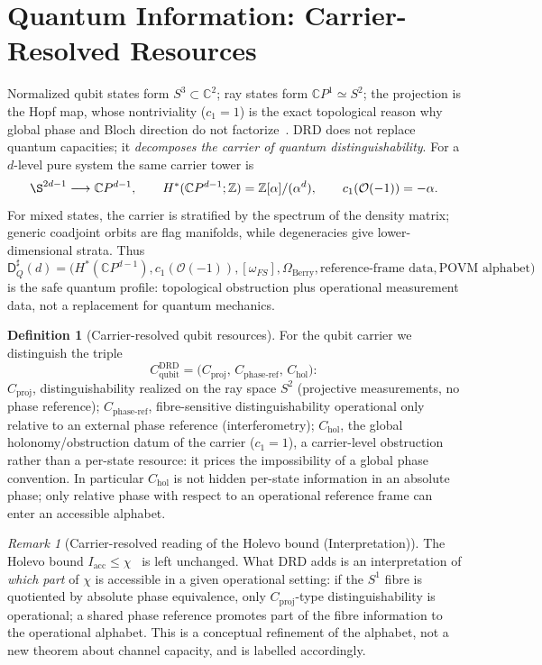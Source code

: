 \documentclass[11pt,a4paper]{article}
\theoremstyle{definition}
\newtheorem{definition}[theorem]{Definition}
\theoremstyle{remark}
\newtheorem{remark}[theorem]{Remark}
\newcommand{\Sone}{S^{1}}
\newcommand{\Stwo}{S^{2}}
\newcommand{\Sthree}{S^{3}}
\newcommand{\C}{\mathbb{C}}
\newcommand{\Z}{\mathbb{Z}}
\newcommand{\CP}{\mathbb{C}P}
\newcommand{\Dsharp}{\mathsf{D}^{\sharp}}
\begin{document}
\section{Quantum Information: Carrier-Resolved Resources}
\label{sec:quantum}

Normalized qubit states form $\Sthree\subset\C^{2}$; ray states form $\CP^{1}\simeq\Stwo$; the
projection is the Hopf map, whose nontriviality ($c_{1}=1$) is the exact topological reason why
global phase and Bloch direction do not factorize~\cite{PB2026susp}.  DRD does not replace
quantum capacities; it \emph{decomposes the carrier of quantum distinguishability}.  For a
$d$-level pure system the same carrier tower is
\[
\S^{2d-1}\longrightarrow \CP^{d-1},
\qquad H^*(\CP^{d-1};\Z)=\Z[\alpha]/(\alpha^d),
\qquad c_1(\mathcal O(-1))=-\alpha.
\]
For mixed states, the carrier is stratified by the spectrum of the density matrix; generic
coadjoint orbits are flag manifolds, while degeneracies give lower-dimensional strata.  Thus
\[
\Dsharp_Q(d)=\big(H^*(\CP^{d-1}),c_1(\mathcal O(-1)),[\omega_{FS}],
\Omega_{\mathrm{Berry}},\text{reference-frame data},\text{POVM alphabet}\big)
\]
is the safe quantum profile: topological obstruction plus operational measurement data, not a
replacement for quantum mechanics.

\begin{definition}[Carrier-resolved qubit resources]
\label{def:qubit}
For the qubit carrier we distinguish the triple
\begin{equation}
C^{\mathrm{DRD}}_{\mathrm{qubit}}
=\big(C_{\mathrm{proj}},\,C_{\mathrm{phase\text{-}ref}},\,C_{\mathrm{hol}}\big):
\end{equation}
$C_{\mathrm{proj}}$, distinguishability realized on the ray space $\Stwo$ (projective
measurements, no phase reference); $C_{\mathrm{phase\text{-}ref}}$, fibre-sensitive
distinguishability operational only relative to an external phase reference (interferometry);
$C_{\mathrm{hol}}$, the global holonomy/obstruction datum of the carrier ($c_{1}=1$), a
carrier-level obstruction rather than a per-state resource: it prices the impossibility of a
global phase convention.  In particular $C_{\mathrm{hol}}$ is not hidden per-state information
in an absolute phase; only relative phase with respect to an operational reference frame can
enter an accessible alphabet.
\end{definition}

\begin{remark}[Carrier-resolved reading of the Holevo bound (Interpretation)]
The Holevo bound $I_{\mathrm{acc}}\le\chi$~\cite{Holevo1973} is left unchanged.  What DRD adds
is an interpretation of \emph{which part} of $\chi$ is accessible in a given operational
setting: if the $\Sone$ fibre is quotiented by absolute phase equivalence, only
$C_{\mathrm{proj}}$-type distinguishability is operational; a shared phase reference promotes
part of the fibre information to the operational alphabet.  This is a conceptual refinement of
the alphabet, not a new theorem about channel capacity, and is labelled accordingly.
\end{remark}
\end{document}
